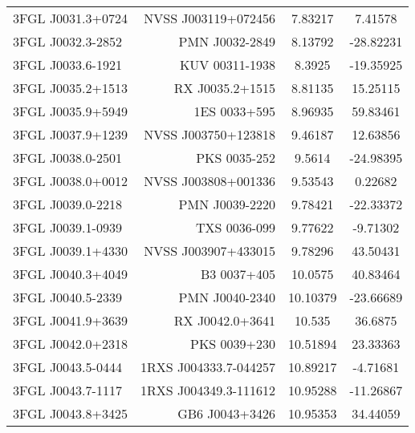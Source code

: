 \begin{table}
\begin{tabular}{l r c c}
3FGL J0031.3+0724  &  NVSS J003119+072456  &  7.83217  &  7.41578  \\
3FGL J0032.3-2852  &  PMN J0032-2849  &  8.13792  &  -28.82231  \\
3FGL J0033.6-1921  &  KUV 00311-1938  &  8.3925  &  -19.35925  \\
3FGL J0035.2+1513  &  RX J0035.2+1515  &  8.81135  &  15.25115  \\
3FGL J0035.9+5949  &  1ES 0033+595  &  8.96935  &  59.83461  \\
3FGL J0037.9+1239  &  NVSS J003750+123818  &  9.46187  &  12.63856  \\
3FGL J0038.0-2501  &  PKS 0035-252  &  9.5614  &  -24.98395  \\
3FGL J0038.0+0012  &  NVSS J003808+001336  &  9.53543  &  0.22682  \\
3FGL J0039.0-2218  &  PMN J0039-2220  &  9.78421  &  -22.33372  \\
3FGL J0039.1-0939  &  TXS 0036-099  &  9.77622  &  -9.71302  \\
3FGL J0039.1+4330  &  NVSS J003907+433015  &  9.78296  &  43.50431  \\
3FGL J0040.3+4049  &  B3 0037+405  &  10.0575  &  40.83464  \\
3FGL J0040.5-2339  &  PMN J0040-2340  &  10.10379  &  -23.66689  \\
3FGL J0041.9+3639  &  RX J0042.0+3641  &  10.535  &  36.6875  \\
3FGL J0042.0+2318  &  PKS 0039+230  &  10.51894  &  23.33363  \\
3FGL J0043.5-0444  &  1RXS J004333.7-044257  &  10.89217  &  -4.71681  \\
3FGL J0043.7-1117  &  1RXS J004349.3-111612  &  10.95288  &  -11.26867  \\
3FGL J0043.8+3425  &  GB6 J0043+3426  &  10.95353  &  34.44059  \\
\bottomrule
\end{tabular}
\end{table}


